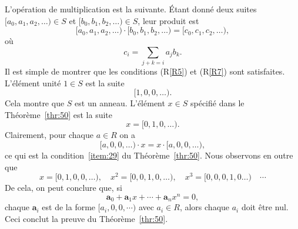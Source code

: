 L'opération de multiplication est la suivante. Étant donné deux suites $[a_0,a_1,a_2, \dots ) ∈S$ et $   [b_0,b_1,b_2, \dots ) ∈S$, leur produit est 
\begin{displaymath}
  [a_0,a_1,a_2, \dots ) ⋅   [b_0,b_1,b_2, \dots ) =  [c_0,c_1,c_2, \dots ), 
\end{displaymath}
où
\begin{displaymath}
  c_i = ∑_{j+k = i} a_jb_k.
\end{displaymath}
Il est simple de montrer que les conditions (R\ref{R5}) et (R\ref{R7}) sont satisfaites. L'élément unité $1 ∈ S$ est la suite
\begin{displaymath}
  [1,0,0, \dots). 
\end{displaymath}
Cela montre que $S$ est un anneau. L'élément $x ∈ S$ spécifié dans le Théorème~\ref{thr:50} est la suite
 \begin{displaymath}
 x =  [0,1,0, \dots). 
\end{displaymath}
Clairement, pour chaque $a ∈R$ on a
\begin{displaymath}
  [a,0,0,\dots) ⋅ x = x ⋅[a,0,0,\dots), 
\end{displaymath}
ce qui est la condition~\ref{item:29} du Théorème~\ref{thr:50}. 
Nous observons en outre que
\begin{displaymath}
  x = [0,1,0,0,\dots  ),\quad   x^2 = [0,0,1,0,\dots  ) ,\quad   x^3 = [0,0,0,1,0\dots  )  \quad \cdots 
\end{displaymath}
De cela, on peut conclure que, si 
\begin{displaymath}
  \mathbf{a}_0 + \mathbf{a}_1 x + \cdots + \mathbf{a}_n x^n = 0,
\end{displaymath}
chaque $\mathbf{a}_i$ est de la forme $[a_i,0,0, \cdots )$ avec $a_i ∈R$, alors chaque $a_i$ doit être nul. Ceci conclut la preuve du Théorème~\ref{thr:50}.





